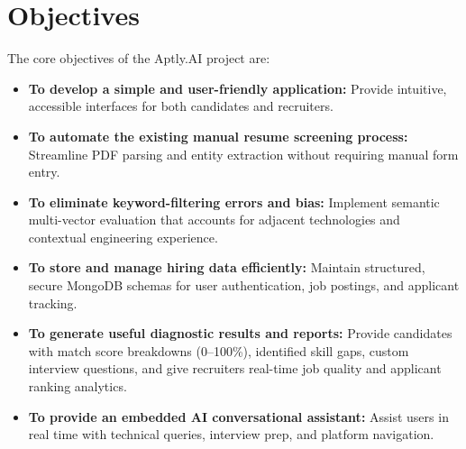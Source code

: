 \documentclass[12pt, a4paper]{article}
\begin{document}
\section{Objectives}
The core objectives of the Aptly.AI project are:
\begin{itemize}[leftmargin=1.5em, itemsep=2pt]
    \item \textbf{To develop a simple and user-friendly application:} Provide intuitive, accessible interfaces for both candidates and recruiters.
    \item \textbf{To automate the existing manual resume screening process:} Streamline PDF parsing and entity extraction without requiring manual form entry.
    \item \textbf{To eliminate keyword-filtering errors and bias:} Implement semantic multi-vector evaluation that accounts for adjacent technologies and contextual engineering experience.
    \item \textbf{To store and manage hiring data efficiently:} Maintain structured, secure MongoDB schemas for user authentication, job postings, and applicant tracking.
    \item \textbf{To generate useful diagnostic results and reports:} Provide candidates with match score breakdowns (0--100\%), identified skill gaps, custom interview questions, and give recruiters real-time job quality and applicant ranking analytics.
    \item \textbf{To provide an embedded AI conversational assistant:} Assist users in real time with technical queries, interview prep, and platform navigation.
\end{itemize}

\newpage

\end{document}
